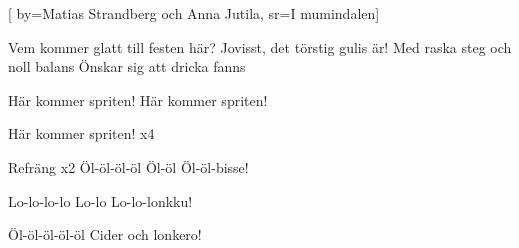 [ 	
	by={Matias Strandberg och Anna Jutila},						
	sr={I mumindalen}]		
	
\beginverse*						
Vem kommer glatt till festen här?
Jovisst, det törstig gulis är!
Med raska steg och noll balans
Önskar sig att dricka fanns
\endverse						

\beginverse				
Här kommer spriten! 
Här kommer spriten!
\endverse				

\beginverse				
Här kommer spriten! x4
\endverse				

\beginverse				
Refräng x2
Öl-öl-öl-öl
Öl-öl
Öl-öl-bisse!
\endverse				

\beginverse				
Lo-lo-lo-lo
Lo-lo
Lo-lo-lonkku!
\endverse				

\beginverse				
Öl-öl-öl-öl-öl
Cider och lonkero!
\endverse				
\endsong	
